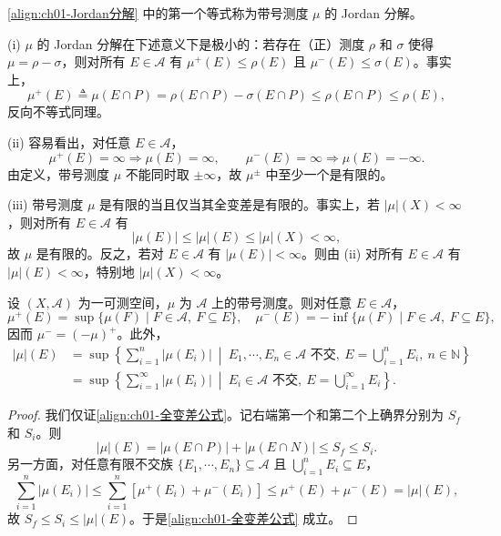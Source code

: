 \documentclass[../../main.tex]{subfiles}%
\begin{document}
\begin{definition}\label{definition:ch01-Jordan分解}
\eqref{align:ch01-Jordan分解} 中的第一个等式称为带号测度 $\mu$ 的 Jordan 分解。
\end{definition}

\begin{remark}\label{remark:ch01-Jordan性质}\label{remark:ch01-Jordan变差}
(i) $\mu$ 的 Jordan 分解在下述意义下是极小的：若存在（正）测度 $\rho$ 和 $\sigma$ 使得 $\mu=\rho-\sigma$，则对所有 $E\in\mathcal{A}$ 有 $\mu^+(E)\leqslant\rho(E)$ 且 $\mu^-(E)\leqslant\sigma(E)$。事实上，
\[
\mu^+(E)\triangleq \mu(E\cap P)=\rho(E\cap P)-\sigma(E\cap P)\leqslant\rho(E\cap P)\leqslant\rho(E),
\]
反向不等式同理。

(ii) 容易看出，对任意 $E\in\mathcal{A}$，
\[
\mu^+(E)=\infty\Rightarrow\mu(E)=\infty,\qquad
\mu^-(E)=\infty\Rightarrow\mu(E)=-\infty.
\]
由定义，带号测度 $\mu$ 不能同时取 $\pm\infty$，故 $\mu^\pm$ 中至少一个是有限的。

(iii) 带号测度 $\mu$ 是有限的当且仅当其全变差是有限的。事实上，若 $|\mu|(X)<\infty$，则对所有 $E\in\mathcal{A}$ 有
\[
|\mu(E)|\leqslant|\mu|(E)\leqslant|\mu|(X)<\infty,
\]
故 $\mu$ 是有限的。反之，若对 $E\in\mathcal{A}$ 有 $|\mu(E)|<\infty$。则由 (ii) 对所有 $E\in\mathcal{A}$ 有 $|\mu|(E)<\infty$，特别地 $|\mu|(X)<\infty$。
\end{remark}

\label{subsection:ch01-全变差}

\begin{proposition}\label{proposition:ch01-变差公式}\label{proposition:ch01-正变差}\label{proposition:ch01-全变差}
设 $(X,\mathcal{A})$ 为一可测空间，$\mu$ 为 $\mathcal{A}$ 上的带号测度。则对任意 $E\in\mathcal{A}$，
\[
\mu^+(E)=\sup\{\mu(F)\mid F\in\mathcal{A},\ F\subseteq E\},\quad
\mu^-(E)=-\inf\{\mu(F)\mid F\in\mathcal{A},\ F\subseteq E\},
\]
因而 $\mu^-=(-\mu)^+$。此外，
\begin{align}
|\mu|(E)&=\sup\left\{\sum_{i=1}^n|\mu(E_i)|\ \middle|\ E_1,\cdots ,E_n\in\mathcal{A}\text{ 不交},\ E=\bigcup_{i=1}^n E_i,\ n\in\mathbb{N}\right\} \nonumber\\
&=\sup\left\{\sum_{i=1}^\infty|\mu(E_i)|\ \middle|\ E_i\in\mathcal{A}\text{ 不交},\ E=\bigcup_{i=1}^\infty E_i\right\}. \label{align:ch01-全变差公式}
\end{align}
\end{proposition}

\begin{proof}
我们仅证\eqref{align:ch01-全变差公式}。记右端第一个和第二个上确界分别为 $S_f$ 和 $S_i$。则
\[
|\mu|(E)=|\mu(E\cap P)|+|\mu(E\cap N)|\leqslant S_f\leqslant S_i.
\]
另一方面，对任意有限不交族 $\{E_1,\cdots ,E_n\}\subseteq\mathcal{A}$ 且 $\bigcup_{i=1}^n E_i\subseteq E$，
\[
\sum_{i=1}^n|\mu(E_i)|\leqslant\sum_{i=1}^n[\mu^+(E_i)+\mu^-(E_i)]
\leqslant\mu^+(E)+\mu^-(E)=|\mu|(E),
\]
故 $S_f\leqslant S_i\leqslant|\mu|(E)$。于是\eqref{align:ch01-全变差公式} 成立。
\end{proof}
\end{document}
